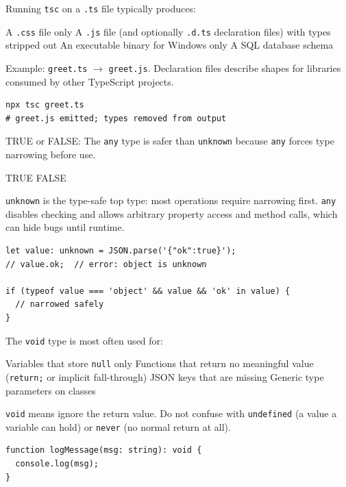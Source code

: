 \newpage




\question[4]
Running \lstinline[style=bashinline]|tsc| on a \texttt{.ts} file typically produces:
\begin{choices}
  \choice A \texttt{.css} file only
  \CorrectChoice A \texttt{.js} file (and optionally \texttt{.d.ts} declaration files) with types stripped out
  \choice An executable binary for Windows only
  \choice A SQL database schema
\end{choices}
\begin{solution}
  Example: \texttt{greet.ts} $\rightarrow$ \texttt{greet.js}. Declaration files describe shapes for libraries consumed by other TypeScript projects.
\begin{lstlisting}[style=bash]
npx tsc greet.ts
# greet.js emitted; types removed from output
\end{lstlisting}
\end{solution}

\question[4]
TRUE or FALSE: The \lstinline[style=tsinline]|any| type is safer than \lstinline[style=tsinline]|unknown| because \lstinline[style=tsinline]|any| forces type narrowing before use.
\begin{choices}
  \choice TRUE
  \CorrectChoice FALSE
\end{choices}
\begin{solution}
  \lstinline[style=tsinline]|unknown| is the type-safe top type: most operations require narrowing first. \lstinline[style=tsinline]|any| disables checking and allows arbitrary property access and method calls, which can hide bugs until runtime.
\begin{lstlisting}[style=ts]
let value: unknown = JSON.parse('{"ok":true}');
// value.ok;  // error: object is unknown

if (typeof value === 'object' && value && 'ok' in value) {
  // narrowed safely
}
\end{lstlisting}
\end{solution}

\question[4]
The \lstinline[style=tsinline]|void| type is most often used for:
\begin{choices}
  \choice Variables that store \lstinline[style=tsinline]|null| only
  \CorrectChoice Functions that return no meaningful value (\lstinline[style=tsinline]|return;| or implicit fall-through)
  \choice JSON keys that are missing
  \choice Generic type parameters on classes
\end{choices}
\begin{solution}
  \lstinline[style=tsinline]|void| means ignore the return value. Do not confuse with \lstinline[style=tsinline]|undefined| (a value a variable can hold) or \lstinline[style=tsinline]|never| (no normal return at all).
\begin{lstlisting}[style=ts]
function logMessage(msg: string): void {
  console.log(msg);
}
\end{lstlisting}
\end{solution}



